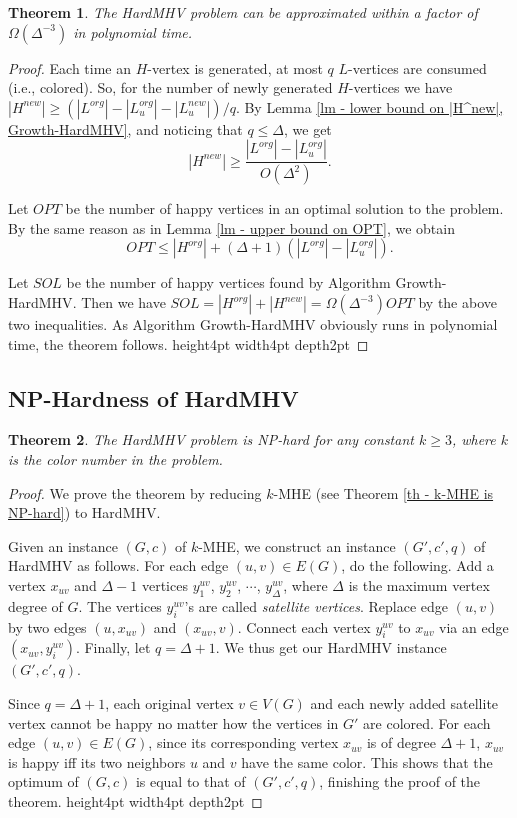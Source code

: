 \documentclass[11pt]{article}
\newtheorem{theorem}{Theorem}[section]
\newcommand{\qed}{\vrule height4pt width4pt depth2pt}
\begin{document}
\begin{theorem}
The HardMHV problem can be approximated within a factor of
$\Omega(\Delta^{-3})$ in polynomial time.
\end{theorem}
\begin{proof}
Each time an $H$-vertex is generated, at most $q$ $L$-vertices are consumed
(i.e., colored). So, for the number of newly generated $H$-vertices we have
$|H^{new}| \geq (|L^{org}| - |L_{u}^{org}| - |L_{u}^{new}|) / q$.
By Lemma \ref{lm - lower bound on |H^new|, Growth-HardMHV}, and noticing
that $q \leq \Delta$, we get
\begin{equation}
|H^{new}| \geq \frac{|L^{org}| - |L_{u}^{org}|}{O(\Delta^2)}.
\nonumber
\end{equation}

Let $OPT$ be the number of happy vertices in an optimal solution to
the problem. By the same reason as in Lemma \ref{lm - upper bound on OPT},
we obtain
\begin{equation}
OPT \leq |H^{org}| + (\Delta+1) (|L^{org}| - |L_{u}^{org}|). \nonumber
\end{equation}

Let $SOL$ be the number of happy vertices found by Algorithm
{\sc Growth-HardMHV}. Then we have
$SOL = |H^{org}| + |H^{new}| = \Omega(\Delta^{-3}) OPT$
by the above two inequalities.
As Algorithm {\sc Growth-HardMHV} obviously runs in polynomial time,
the theorem follows.
\qed
\end{proof}




\subsection{NP-Hardness of HardMHV}
\begin{theorem}
The HardMHV problem is NP-hard for any constant $k \geq 3$, where $k$ is
the color number in the problem.
\end{theorem}
\begin{proof}
We prove the theorem by reducing $k$-MHE (see Theorem \ref{th - k-MHE is NP-hard})
to HardMHV.

Given an instance $(G, c)$ of $k$-MHE, we construct an instance $(G', c', q)$
of HardMHV as follows. For each edge $(u, v) \in E(G)$, do the following.
Add a vertex $x_{uv}$ and $\Delta - 1$ vertices
$y_1^{uv}$, $y_2^{uv}$, $\cdots$, $y_{\Delta}^{uv}$, where $\Delta$ is
the maximum vertex degree of $G$. The vertices $y_i^{uv}$'s are called
{\em satellite vertices}.
Replace edge $(u, v)$ by two edges $(u, x_{uv})$ and $(x_{uv}, v)$.
Connect each vertex $y_i^{uv}$ to $x_{uv}$ via an edge $(x_{uv}, y_i^{uv})$.
Finally, let $q = \Delta + 1$. We thus get our HardMHV instance
$(G', c', q)$.

Since $q = \Delta + 1$, each original vertex $v \in V(G)$ and each newly
added satellite vertex cannot be happy no matter how the vertices in $G'$
are colored. For each edge $(u, v) \in E(G)$, since its corresponding vertex
$x_{uv}$ is of degree $\Delta + 1$, $x_{uv}$ is happy iff its
two neighbors $u$ and $v$ have the same color. This shows that
the optimum of $(G, c)$ is equal to that of $(G', c', q)$, finishing
the proof of the theorem.
\qed
\end{proof}
\end{document}
